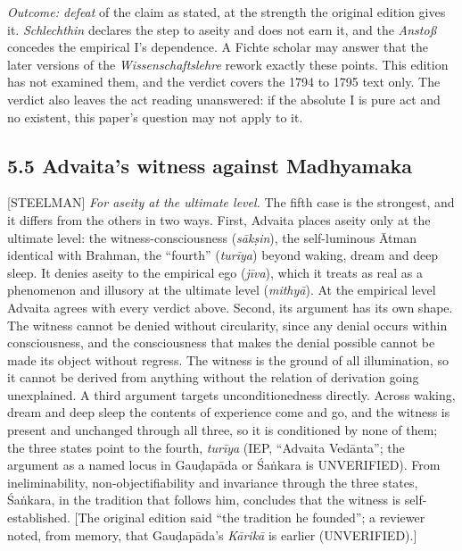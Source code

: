 \documentclass[11pt]{article}
\newcommand{\register}[1]{{\ttfamily\small #1}}
\begin{document}
\emph{Outcome: defeat} of the claim as stated, at the strength the original edition gives it. \emph{Schlechthin} declares the step to aseity and does not earn it, and the \emph{Anstoß} concedes the empirical I's dependence. A Fichte scholar may answer that the later versions of the \emph{Wissenschaftslehre} rework exactly these points. This edition has not examined them, and the verdict covers the 1794 to 1795 text only. The verdict also leaves the act reading unanswered: if the absolute I is pure act and no existent, this paper's question may not apply to it.

\subsection*{5.5 Advaita's witness against Madhyamaka}

\register{[STEELMAN]} \emph{For aseity at the ultimate level.} The fifth case is the strongest, and it differs from the others in two ways. First, Advaita places aseity only at the ultimate level: the witness-consciousness (\emph{sākṣin}), the self-luminous Ātman identical with Brahman, the ``fourth'' (\emph{turīya}) beyond waking, dream and deep sleep. It denies aseity to the empirical ego (\emph{jīva}), which it treats as real as a phenomenon and illusory at the ultimate level (\emph{mithyā}). At the empirical level Advaita agrees with every verdict above. Second, its argument has its own shape. The witness cannot be denied without circularity, since any denial occurs within consciousness, and the consciousness that makes the denial possible cannot be made its object without regress. The witness is the ground of all illumination, so it cannot be derived from anything without the relation of derivation going unexplained. A third argument targets unconditionedness directly. Across waking, dream and deep sleep the contents of experience come and go, and the witness is present and unchanged through all three, so it is conditioned by none of them; the three states point to the fourth, \emph{turīya} (IEP, ``Advaita Vedānta''; the argument as a named locus in Gauḍapāda or Śaṅkara is UNVERIFIED). From ineliminability, non-objectifiability and invariance through the three states, Śaṅkara, in the tradition that follows him, concludes that the witness is self-established. [The original edition said ``the tradition he founded''; a reviewer noted, from memory, that Gauḍapāda's \emph{Kārikā} is earlier (UNVERIFIED).]
\end{document}
